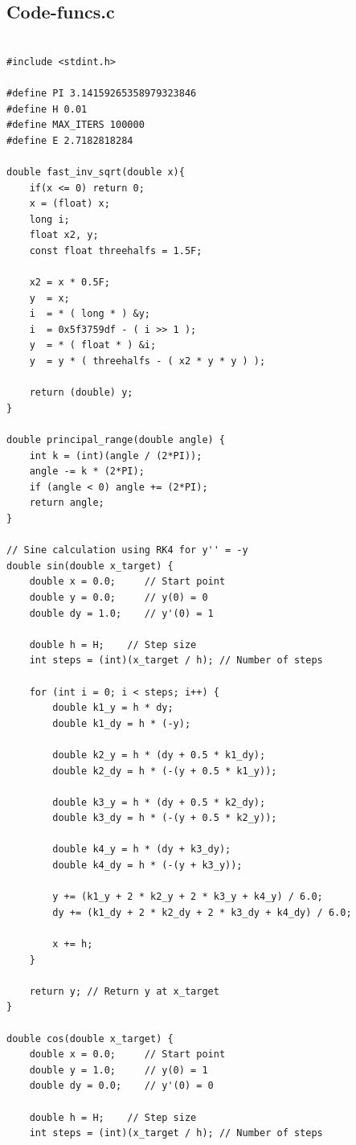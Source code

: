 \documentclass[journal]{IEEEtran}
\numberwithin{equation}{enumi}
\numberwithin{figure}{enumi}
\begin{document}
\subsection{Code-funcs.c}
\begin{lstlisting}

#include <stdint.h>

#define PI 3.14159265358979323846
#define H 0.01
#define MAX_ITERS 100000
#define E 2.7182818284

double fast_inv_sqrt(double x){
    if(x <= 0) return 0;
    x = (float) x;
	long i;
	float x2, y;
	const float threehalfs = 1.5F;

	x2 = x * 0.5F;
	y  = x;
	i  = * ( long * ) &y;
	i  = 0x5f3759df - ( i >> 1 );
	y  = * ( float * ) &i;
	y  = y * ( threehalfs - ( x2 * y * y ) );

	return (double) y;
}

double principal_range(double angle) {
    int k = (int)(angle / (2*PI));
    angle -= k * (2*PI);
    if (angle < 0) angle += (2*PI);
    return angle;
}

// Sine calculation using RK4 for y'' = -y
double sin(double x_target) {
    double x = 0.0;     // Start point
    double y = 0.0;     // y(0) = 0
    double dy = 1.0;    // y'(0) = 1

    double h = H;    // Step size
    int steps = (int)(x_target / h); // Number of steps

    for (int i = 0; i < steps; i++) {
        double k1_y = h * dy;
        double k1_dy = h * (-y);

        double k2_y = h * (dy + 0.5 * k1_dy);
        double k2_dy = h * (-(y + 0.5 * k1_y));

        double k3_y = h * (dy + 0.5 * k2_dy);
        double k3_dy = h * (-(y + 0.5 * k2_y));

        double k4_y = h * (dy + k3_dy);
        double k4_dy = h * (-(y + k3_y));

        y += (k1_y + 2 * k2_y + 2 * k3_y + k4_y) / 6.0;
        dy += (k1_dy + 2 * k2_dy + 2 * k3_dy + k4_dy) / 6.0;

        x += h;
    }

    return y; // Return y at x_target
}

double cos(double x_target) {
    double x = 0.0;     // Start point
    double y = 1.0;     // y(0) = 1
    double dy = 0.0;    // y'(0) = 0
    
    double h = H;    // Step size
    int steps = (int)(x_target / h); // Number of steps


\end{lstlisting}
\end{document}
